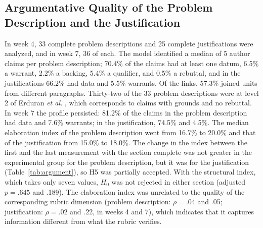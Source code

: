 \documentclass[journal]{IEEEtran}
\begin{document}
\subsection{Argumentative Quality of the Problem Description and the Justification}

In week 4, 33 complete problem descriptions and 25 complete justifications were analyzed, and in week 7, 36 of each. The model identified a median of 5 author claims per problem description; 70.4\% of the claims had at least one datum, 6.5\% a warrant, 2.2\% a backing, 5.4\% a qualifier, and 0.5\% a rebuttal, and in the justifications 66.2\% had data and 5.5\% warrants. Of the links, 57.3\% joined units from different paragraphs. Thirty-two of the 33 problem descriptions were at level 2 of Erduran \emph{et al.} \cite{erduran2004}, which corresponds to claims with grounds and no rebuttal. In week 7 the profile persisted: 81.2\% of the claims in the problem description had data and 7.6\% warrants; in the justification, 74.5\% and 4.5\%. The median elaboration index of the problem description went from 16.7\% to 20.0\% and that of the justification from 15.0\% to 18.0\%. The change in the index between the first and the last measurement with the section complete was not greater in the experimental group for the problem description, but it was for the justification (Table~\ref{tab:argument}), so H5 was partially accepted. With the structural index, which takes only seven values, $H_0$ was not rejected in either section (adjusted $p = .645$ and .189). The elaboration index was unrelated to the quality of the corresponding rubric dimension (problem description: $\rho = .04$ and .05; justification: $\rho = .02$ and .22, in weeks 4 and 7), which indicates that it captures information different from what the rubric verifies.
\end{document}
